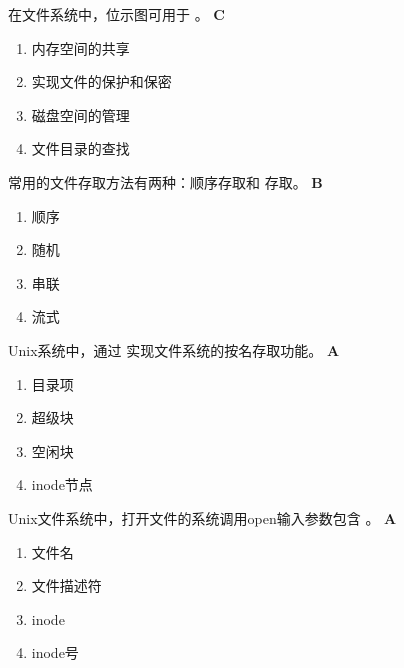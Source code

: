 \begin{problem}
	在文件系统中，位示图可用于 \myline。
	\textbf{C}
	\vspace{-0.5em}
	\begin{multicols}{2}
		\begin{enumerate}[label=\Alph*.]
			\item 内存空间的共享
			\item 实现文件的保护和保密
			\item 磁盘空间的管理
			\item 文件目录的查找
		\end{enumerate}
	\end{multicols}
	\vspace{-1em}
\end{problem}


\begin{problem}
	常用的文件存取方法有两种：顺序存取和 \myline 存取。
	\textbf{B}
	\vspace{-0.5em}
	\begin{multicols}{4}
		\begin{enumerate}[label=\Alph*.]
			\item 顺序
			\item 随机
			\item 串联
			\item 流式
		\end{enumerate}
	\end{multicols}
	\vspace{-1em}
\end{problem}


\begin{problem}
	Unix系统中，通过 \myline 实现文件系统的按名存取功能。
	\textbf{A}
	\vspace{-0.5em}
	\begin{multicols}{4}
		\begin{enumerate}[label=\Alph*.]
			\item 目录项
			\item 超级块
			\item 空闲块
			\item inode节点
		\end{enumerate}
	\end{multicols}
	\vspace{-1em}
\end{problem}


\begin{problem}
	Unix文件系统中，打开文件的系统调用open输入参数包含 \myline。
	\textbf{A}
	\vspace{-0.5em}
	\begin{multicols}{4}
		\begin{enumerate}[label=\Alph*.]
			\item 文件名
			\item 文件描述符
			\item inode
			\item inode号
		\end{enumerate}
	\end{multicols}
	\vspace{-1em}
\end{problem}


